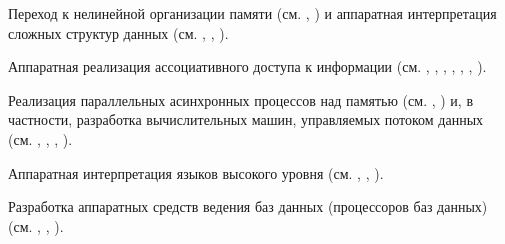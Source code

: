 \begin{textitemize}
\item Переход к нелинейной организации памяти (см. , ) и аппаратная интерпретация сложных структур данных (см.  , , ).
\item Аппаратная реализация ассоциативного доступа к информации (см. , , , , , , ).
\item Реализация параллельных асинхронных процессов над памятью (см. , ) и, в частности, разработка вычислительных машин, управляемых потоком данных (см. , , , ).
\item Аппаратная интерпретация языков высокого уровня (см. , , ).
\item Разработка аппаратных средств ведения баз данных (процессоров баз данных) (см. , , ).
\end{textitemize}
	
